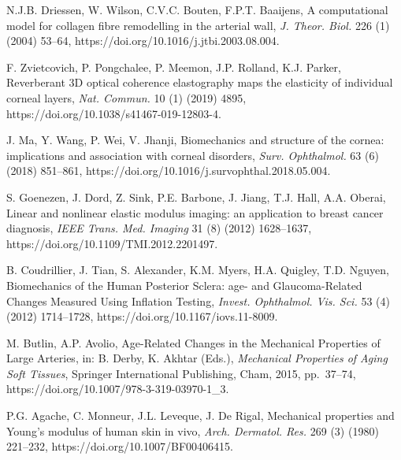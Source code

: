 \documentclass[11pt]{article}
\begin{document}

\newpage


\begin{list}{}{%
  \setlength{\leftmargin}{2em}%
  \setlength{\itemindent}{-2em}%
  \setlength{\itemsep}{0.5em}%
  \setlength{\parsep}{0pt}%
}

\item [5] N.J.B. Driessen, W. Wilson, C.V.C. Bouten, F.P.T.
Baaijens, A computational model for collagen fibre remodelling
in the arterial wall, \emph{J. Theor. Biol.} 226 (1) (2004)
53--64, https://doi.org/10.1016/j.jtbi.2003.08.004.

\item [6] F. Zvietcovich, P. Pongchalee, P. Meemon, J.P.
Rolland, K.J. Parker, Reverberant 3D optical coherence
elastography maps the elasticity of individual corneal layers,
\emph{Nat. Commun.} 10 (1) (2019) 4895,
https://doi.org/10.1038/s41467-019-12803-4.

\item [7] J. Ma, Y. Wang, P. Wei, V. Jhanji, Biomechanics and
structure of the cornea: implications and association with
corneal disorders, \emph{Surv. Ophthalmol.} 63 (6) (2018)
851--861, https://doi.org/10.1016/j.survophthal.2018.05.004.

\item [8] S. Goenezen, J. Dord, Z. Sink, P.E. Barbone, J. Jiang,
T.J. Hall, A.A. Oberai, Linear and nonlinear elastic modulus
imaging: an application to breast cancer diagnosis, \emph{IEEE
Trans. Med. Imaging} 31 (8) (2012) 1628--1637,
https://doi.org/10.1109/TMI.2012.2201497.

\item [9] B. Coudrillier, J. Tian, S. Alexander, K.M. Myers,
H.A. Quigley, T.D. Nguyen, Biomechanics of the Human Posterior
Sclera: age- and Glaucoma-Related Changes Measured Using
Inflation Testing, \emph{Invest. Ophthalmol. Vis. Sci.} 53 (4)
(2012) 1714--1728, https://doi.org/10.1167/iovs.11-8009.

\item [10] M. Butlin, A.P. Avolio, Age-Related Changes in the
Mechanical Properties of Large Arteries, in: B. Derby, K.
Akhtar (Eds.), \emph{Mechanical Properties of Aging Soft
Tissues}, Springer International Publishing, Cham, 2015,
pp.~37--74, https://doi.org/10.1007/978-3-319-03970-1\_3.

\item [11] P.G. Agache, C. Monneur, J.L. Leveque, J. De Rigal,
Mechanical properties and Young's modulus of human skin in
vivo, \emph{Arch. Dermatol. Res.} 269 (3) (1980) 221--232,
https://doi.org/10.1007/BF00406415.


\end{list}
\end{document}
